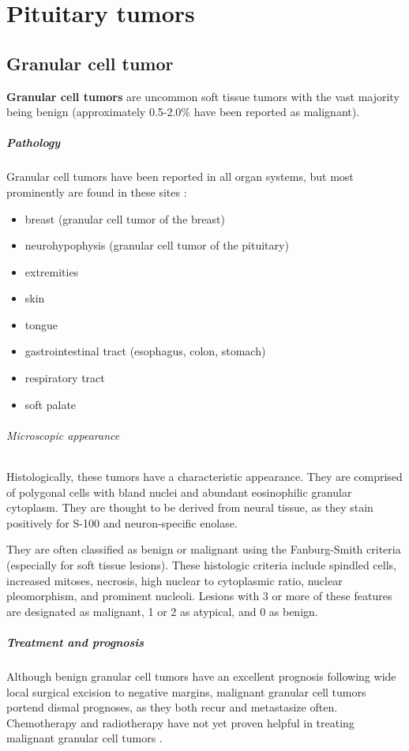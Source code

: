 \chapter{Pituitary tumors}

\section{Granular cell tumor}

\textbf{Granular cell tumors} are uncommon soft tissue tumors with the vast majority being benign (approximately 0.5-2.0\% have been reported as malignant).

\paragraph{Pathology}

Granular cell tumors have been reported in all organ systems, but most prominently are found in these sites :

\begin{itemize}
	\item
	breast (granular cell tumor of the breast)
	\item
	neurohypophysis (granular cell tumor of the pituitary)
	\item
	extremities
	\item
	skin
	\item
	tongue
	\item
	gastrointestinal tract (esophagus, colon, stomach)
	\item
	respiratory tract
	\item
	soft palate
\end{itemize}

\subparagraph{Microscopic appearance}

Histologically, these tumors have a characteristic appearance. They are comprised of polygonal cells with bland nuclei and abundant eosinophilic granular cytoplasm. They are thought to be derived from neural tissue, as they stain positively for S-100 and neuron-specific enolase.

They are often classified as benign or malignant using the Fanburg-Smith criteria (especially for soft tissue lesions). These histologic criteria include spindled cells, increased mitoses, necrosis, high nuclear to cytoplasmic ratio, nuclear pleomorphism, and prominent nucleoli. Lesions with 3 or more of these features are designated as malignant, 1 or 2 as atypical, and 0 as benign.

\paragraph{Treatment and prognosis}

Although benign granular cell tumors have an excellent prognosis following wide local surgical excision to negative margins, malignant granular cell tumors portend dismal prognoses, as they both recur and metastasize often. Chemotherapy and radiotherapy have not yet proven helpful in treating malignant granular cell tumors .